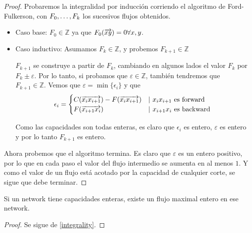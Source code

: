 \begin{proof}
  Probaremos la integralidad por inducción corriendo el algoritmo de
  Ford-Fulkerson, con $F_0, \mathellipsis, F_k$ los sucesivos flujos
  obtenidos.
  \begin{itemize}
    \item[] Caso base: $F_0 \in \mathbb{Z}$ ya que $F_0(\overrightarrow{xy}) = 0 \forall x, y$.
    \item[] Caso inductivo: Asumamos $F_k \in \mathbb{Z}$, y probemos
      $F_{k+1} \in \mathbb{Z}$

      $F_{k+1}$ se construye a partir de $F_k$, cambiando en algunos lados el valor
      $F_k$ por $F_k \pm \varepsilon$. Por lo tanto, si probamos que
      $\varepsilon \in \mathbb{Z}$, también tendremos que $F_{k+1} \in \mathbb{Z}$.
      Vemos que $\varepsilon = \min\{\epsilon_i\}$ y que
      \begin{align}
        \epsilon_i =
        \begin{cases}
          C(\overrightarrow{x_ix_{i+1}}) - F(\overrightarrow{x_ix_{i+1}}) & |\ x_ix_{i+1} \text{ es forward}\\
          F(\overrightarrow{x_{i+1} x_i}) & |\ x_{i+1}x_i \text{ es backward}
        \end{cases}
      \end{align}

      Como las capacidades son todas enteras, es claro que $\epsilon_i$ es entero,
      $\varepsilon$ es entero y por lo tanto $F_{k+1}$ es entero.
  \end{itemize}

  Ahora probemos que el algoritmo termina. Es claro que $\varepsilon$ es un
  entero positivo, por lo que en cada paso el valor del flujo intermedio se
  aumenta en al menos $1$. Y como el valor de un flujo está acotado por la
  capacidad de cualquier corte, se sigue que debe terminar.
\end{proof}

\begin{corollary}
  Si un network tiene capacidades enteras, existe un flujo maximal entero en ese
  network.
\end{corollary}

\begin{proof}
  Se sigue de \ref{integrality}.
\end{proof}

